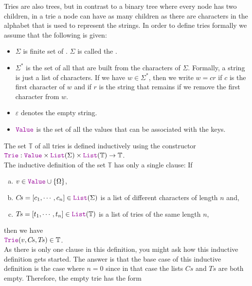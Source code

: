 Tries are also trees, but in contrast to a binary tree where every node has two children, in a trie a
node can have as many children as there are characters in the alphabet that is used to represent the
strings.  In order to define tries formally we assume that the following is given:
\begin{itemize}
\item $\Sigma$ is finite set of . $\Sigma$ is called the
      . 
\item $\Sigma^*$ is the set of all  that are built from the characters of $\Sigma$.
      Formally, a string is just a list of characters.  If we have $w \in \Sigma^*$, then we write $w = cr$
      if $c$ is the first character of $w$ and if $r$ is the string that remains if we remove the first
      character from $w$.
\item $\varepsilon$ denotes the empty string.
\item $\mytt{Value}$ is the set of all the values that can be associated with the keys.  
\end{itemize}
The set $\mathbb{T}$ of all tries  is defined inductively using the constructor \\[0.2cm]
\hspace*{1.3cm} 
$\mytt{Trie}: \mytt{Value} \times \mytt{List}(\Sigma) \times
\mytt{List}(\mathbb{T}) \rightarrow \mathbb{T}$. 
\\[0.2cm]
The inductive definition of the set $\mathbb{T}$  has only a single clause: If
\begin{enumerate}[(a)]
\item $v \in \mytt{Value} \cup \{\Omega\}$,
\item $C\!s = [c_1, \cdots, c_n] \in \mytt{List}(\Sigma)$ is a list of different characters of length
      $n$ and,
\item $T\!s = [t_1, \cdots, t_n] \in \mytt{List}(\mathbb{T})$ is a list of  tries of the same length $n$, 
\end{enumerate}
then we have 
\\[0.2cm]
\hspace*{1.3cm}  $\mytt{Trie}(v, C\!s, T\!s) \in \mathbb{T}$.  
\\[0.2cm]
As there is only one clause in this definition, you might ask how this inductive definition gets started.
The answer is that the base case of this inductive definition is the case where
$n=0$ since in that case the lists  $C\!s$ and $T\!s$ are both empty.  Therefore, the empty trie has the form
